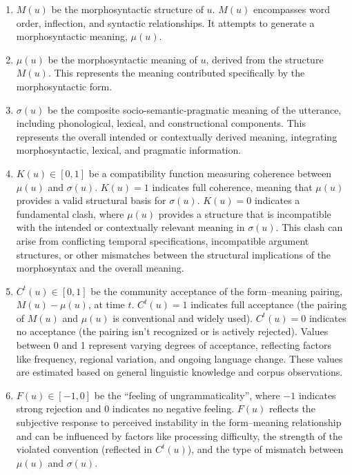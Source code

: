 \documentclass[12pt,letterpaper]{article}
\begin{document}
\begin{enumerate}
    \item \(M(u)\) be the morphosyntactic structure of \(u\).  \(M(u)\) encompasses word order, inflection, and syntactic relationships.  It attempts to generate a morphosyntactic meaning, \(\mu(u)\).
    \item \(\mu(u)\) be the morphosyntactic meaning of \(u\), derived from the structure \(M(u)\). This represents the meaning contributed specifically by the morphosyntactic form.
    \item \(\sigma(u)\) be the composite socio-semantic-pragmatic meaning of the utterance, including phonological, lexical, and constructional components. This represents the overall intended or contextually derived meaning, integrating morphosyntactic, lexical, and pragmatic information.
    \item \(K(u) \in [0,1]\) be a compatibility function measuring coherence between \(\mu(u)\) and \(\sigma(u)\).  \(K(u) = 1\) indicates full coherence, meaning that \(\mu(u)\) provides a valid structural basis for \(\sigma(u)\). \(K(u) = 0\) indicates a fundamental clash, where \(\mu(u)\) provides a structure that is incompatible with the intended or contextually relevant meaning in \(\sigma(u)\). This clash can arise from conflicting temporal specifications, incompatible argument structures, or other mismatches between the structural implications of the morphosyntax and the overall meaning.
    \item \(C^t(u) \in [0,1]\) be the community acceptance of the form--meaning pairing, \(M(u)-\mu(u)\), at time \(t\). \(C^t(u) = 1\) indicates full acceptance (the pairing of \(M(u)\) and \(\mu(u)\) is conventional and widely used).  \(C^t(u) = 0\) indicates no acceptance (the pairing isn't recognized or is actively rejected). Values between 0 and 1 represent varying degrees of acceptance, reflecting factors like frequency, regional variation, and ongoing language change. These values are estimated based on general linguistic knowledge and corpus observations.
    \item \(F(u) \in [-1,0]\) be the \enquote{feeling of ungrammaticality}, where \(-1\) indicates strong rejection and \(0\) indicates no negative feeling.  \(F(u)\) reflects the subjective response to perceived instability in the form--meaning relationship and can be influenced by factors like processing difficulty, the strength of the violated convention (reflected in \(C^t(u)\)), and the type of mismatch between \(\mu(u)\) and \(\sigma(u)\).
\end{enumerate}
\end{document}
